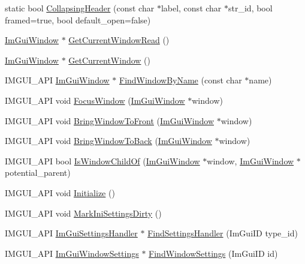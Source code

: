 \begin{DoxyCompactItemize}
\item 
static bool \hyperlink{namespace_im_gui_a9c09b5eb6ecddb39c6374f1323e88cf3}{Collapsing\+Header} (const char $\ast$label, const char $\ast$str\+\_\+id, bool framed=true, bool default\+\_\+open=false)
\item 
\hyperlink{struct_im_gui_window}{Im\+Gui\+Window} $\ast$ \hyperlink{namespace_im_gui_a408f9ddac92f8629a7e273ced5f8c3aa}{Get\+Current\+Window\+Read} ()
\item 
\hyperlink{struct_im_gui_window}{Im\+Gui\+Window} $\ast$ \hyperlink{namespace_im_gui_a7ceba68eca2b09fb6bf1ad88037e6203}{Get\+Current\+Window} ()
\item 
I\+M\+G\+U\+I\+\_\+\+A\+PI \hyperlink{struct_im_gui_window}{Im\+Gui\+Window} $\ast$ \hyperlink{namespace_im_gui_abca25f22c02e73d5eb2e9c72c4557813}{Find\+Window\+By\+Name} (const char $\ast$name)
\item 
I\+M\+G\+U\+I\+\_\+\+A\+PI void \hyperlink{namespace_im_gui_ade4c08e7e7ad7bbfa4835248f5f3a7c6}{Focus\+Window} (\hyperlink{struct_im_gui_window}{Im\+Gui\+Window} $\ast$window)
\item 
I\+M\+G\+U\+I\+\_\+\+A\+PI void \hyperlink{namespace_im_gui_a5a4f4151114339422bfff1b2fffd022c}{Bring\+Window\+To\+Front} (\hyperlink{struct_im_gui_window}{Im\+Gui\+Window} $\ast$window)
\item 
I\+M\+G\+U\+I\+\_\+\+A\+PI void \hyperlink{namespace_im_gui_aa4205bd07b25655ed023f47b52572273}{Bring\+Window\+To\+Back} (\hyperlink{struct_im_gui_window}{Im\+Gui\+Window} $\ast$window)
\item 
I\+M\+G\+U\+I\+\_\+\+A\+PI bool \hyperlink{namespace_im_gui_a2ca7721bfc85f5e98c212c2e9ad793b5}{Is\+Window\+Child\+Of} (\hyperlink{struct_im_gui_window}{Im\+Gui\+Window} $\ast$window, \hyperlink{struct_im_gui_window}{Im\+Gui\+Window} $\ast$potential\+\_\+parent)
\item 
I\+M\+G\+U\+I\+\_\+\+A\+PI void \hyperlink{namespace_im_gui_a1a611da38fae18a3d1dafcb3228259da}{Initialize} ()
\item 
I\+M\+G\+U\+I\+\_\+\+A\+PI void \hyperlink{namespace_im_gui_aee9b660c1d6786c00fc47c71c66eb1eb}{Mark\+Ini\+Settings\+Dirty} ()
\item 
I\+M\+G\+U\+I\+\_\+\+A\+PI \hyperlink{struct_im_gui_settings_handler}{Im\+Gui\+Settings\+Handler} $\ast$ \hyperlink{namespace_im_gui_aec16678be3525f44cd32c1d84ac2d592}{Find\+Settings\+Handler} (Im\+Gui\+ID type\+\_\+id)
\item 
I\+M\+G\+U\+I\+\_\+\+A\+PI \hyperlink{struct_im_gui_window_settings}{Im\+Gui\+Window\+Settings} $\ast$ \hyperlink{namespace_im_gui_a9920e3b99972583f7fed0357b64a3fb2}{Find\+Window\+Settings} (Im\+Gui\+ID id)

\end{DoxyCompactItemize}

